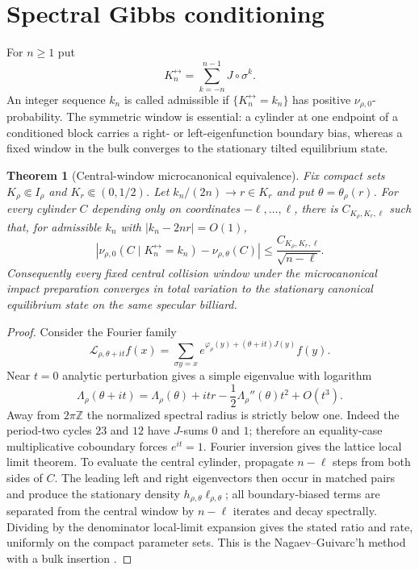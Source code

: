 \documentclass[11pt,reqno]{amsart}
\newtheorem{theorem}{Theorem}[section]
\theoremstyle{definition}
\theoremstyle{remark}
\newcommand{\cL}{\mathcal L}
\newcommand{\abs}[1]{\left\lvert #1\right\rvert}
\begin{document}
\section{Spectral Gibbs conditioning}\label{sec:conditioning}
For $n\ge1$ put
\[
 K_n^{\leftrightarrow}=\sum_{k=-n}^{n-1}J\circ\sigma^k.
\]
An integer sequence $k_n$ is called admissible if
$\{K_n^{\leftrightarrow}=k_n\}$ has positive $\nu_{\rho,0}$-probability.
The symmetric window is essential: a cylinder at one endpoint of a conditioned
block carries a right- or left-eigenfunction boundary bias, whereas a fixed
window in the bulk converges to the stationary tilted equilibrium state.

\begin{theorem}[Central-window microcanonical equivalence]\label{thm:gibbs-conditioning}
Fix compact sets $K_\rho\Subset I_\rho$ and
$K_r\Subset(0,1/2)$.  Let $k_n/(2n)\to r\in K_r$ and put
$\theta=\theta_\rho(r)$.  For every cylinder $C$ depending only on coordinates
$-\ell,\ldots,\ell$, there is $C_{K_\rho,K_r,\ell}$ such that, for admissible
$k_n$ with $\abs{k_n-2nr}=O(1)$,
\[
 \abs{
 \nu_{\rho,0}(C\mid K_n^{\leftrightarrow}=k_n)
 -\nu_{\rho,\theta}(C)}
 \le \frac{C_{K_\rho,K_r,\ell}}{\sqrt{n-\ell}}.
\]
Consequently every fixed central collision window under the microcanonical
impact preparation converges in total variation to the stationary canonical
equilibrium state on the same specular billiard.
\end{theorem}
\begin{proof}
Consider the Fourier family
\[
 \cL_{\rho,\theta+it}f(x)
 =\sum_{\sigma y=x}
 e^{\varphi_\rho(y)+(\theta+it)J(y)}f(y).
\]
Near $t=0$ analytic perturbation gives a simple eigenvalue with logarithm
\[
 \Lambda_\rho(\theta+it)
 =\Lambda_\rho(\theta)+itr
 -\frac12\Lambda_\rho''(\theta)t^2+O(t^3).
\]
Away from $2\pi\mathbb Z$ the normalized spectral radius is strictly below
one.  Indeed the period-two cycles $23$ and $12$ have $J$-sums $0$ and $1$;
therefore an equality-case multiplicative coboundary forces $e^{it}=1$.
Fourier inversion gives the lattice local limit theorem.  To evaluate the
central cylinder, propagate $n-\ell$ steps from both sides of $C$.  The leading
left and right eigenvectors then occur in matched pairs and produce the
stationary density $h_{\rho,\theta}\ell_{\rho,\theta}$; all boundary-biased
terms are separated from the central window by $n-\ell$ iterates and decay
spectrally.  Dividing by the denominator local-limit expansion gives the
stated ratio and rate, uniformly on the compact parameter sets.  This is the
Nagaev--Guivarc'h method with a bulk insertion \cite{HervePene2010}.
\end{proof}
\end{document}
